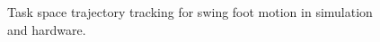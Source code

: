 \begin{figure}[!h]
	\begin{center}
	\end{center}
  	\caption{Task space trajectory tracking for swing foot motion in simulation and hardware.}
	\label{fig:swingfootp}
\end{figure} 

